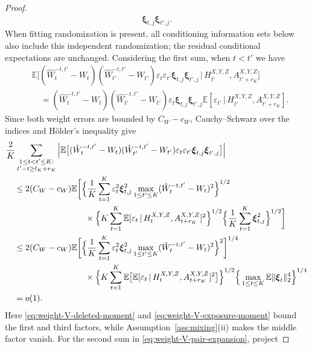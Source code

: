 \documentclass[12pt]{article}
\def\E{\mathbb{E}}
\newcommand\given{\,|\,}
\numberwithin{equation}{section}
\begin{document}
\begin{proof}
\begin{align}
\boldsymbol\xi_{t,j}\boldsymbol\xi_{t',j}.
\label{eq:weight-V-pair-expansion}
\end{align}
When fitting randomization is present, all conditioning information
sets below also include this independent randomization; the residual
conditional expectations are unchanged.
Considering the first sum, when \(t<t'\) we have
\begin{align*}
&\E\big[
(\hat W_t^{-t,t'}-W_t)(\hat W_{t'}^{-t,t'}-W_{t'})
\varepsilon_t\varepsilon_{t'}
\boldsymbol\xi_{t,j}\boldsymbol\xi_{t',j}
\given H_{t'}^{X,Y,Z},A_{t'+r_K}^{X,Y,Z}
\big]\\
&\quad=
(\hat W_t^{-t,t'}-W_t)(\hat W_{t'}^{-t,t'}-W_{t'})
\varepsilon_t\boldsymbol\xi_{t,j}\boldsymbol\xi_{t',j}
\E[\varepsilon_{t'}\given
H_{t'}^{X,Y,Z},A_{t'+r_K}^{X,Y,Z}].
\end{align*}
Since both weight errors are bounded by \(C_W-c_W\),
Cauchy--Schwarz over the indices and H\"older's inequality give
\begin{align}
&\frac2K\sum_{\substack{1\leq t<t'\leq K:\\
t'-t\geq l_K+r_K}}
\Big|\E\big[
(\hat W_t^{-t,t'}-W_t)(\hat W_{t'}^{-t,t'}-W_{t'})
\varepsilon_t\varepsilon_{t'}
\boldsymbol\xi_{t,j}\boldsymbol\xi_{t',j}
\big]\Big|\notag\\
&\quad\leq2(C_W-c_W)\E\bigg[
\Big\{\frac1K\sum_{t=1}^K
\varepsilon_t^2\boldsymbol\xi_{t,j}^2
\max_{1\leq t'\leq K}
(\hat W_t^{-t,t'}-W_t)^2\Big\}^{1/2}\notag\\*
&\hspace{33mm}{}\times
\Big\{K\sum_{t=1}^K
\E[\varepsilon_t\given
H_t^{X,Y,Z},A_{t+r_K}^{X,Y,Z}]^2\Big\}^{1/2}
\Big\{\frac1K\sum_{t=1}^K
\boldsymbol\xi_{t,j}^2\Big\}^{1/2}
\bigg]\notag\\
&\quad\leq2(C_W-c_W)
\E\bigg[\Big\{\frac1K\sum_{t=1}^K
\varepsilon_t^2\boldsymbol\xi_{t,j}^2
\max_{1\leq t'\leq K}
(\hat W_t^{-t,t'}-W_t)^2\Big\}^{2}\bigg]^{1/4}
\notag\\*
&\hspace{33mm}{}\times
\Big\{K\sum_{t=1}^K
\E\big[\E[\varepsilon_t\given
H_t^{X,Y,Z},A_{t+r_K}^{X,Y,Z}]^2\big]\Big\}^{1/2}
\Big\{\max_{1\leq t\leq K}
\E\|\boldsymbol\xi_t\|_2^4\Big\}^{1/4}\notag\\
&\quad=o(1).
\label{eq:weight-V-separated-bound}
\end{align}
Here \eqref{eq:weight-V-deleted-moment} and
\eqref{eq:weight-V-exposure-moment} bound the first and third factors,
while Assumption~\ref{ass:mixing}(ii) makes the middle factor vanish.
For the second sum in \eqref{eq:weight-V-pair-expansion}, project

\end{proof}
\end{document}
